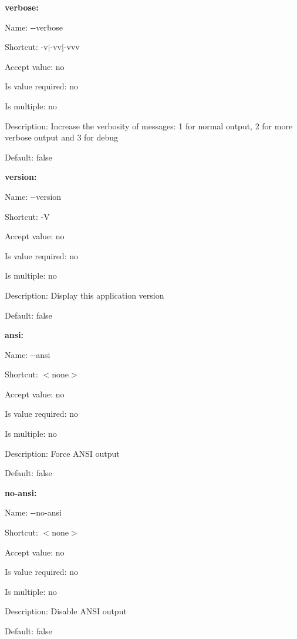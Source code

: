 {\bfseries verbose\+:}


\begin{DoxyItemize}
\item Name\+: {\ttfamily -\/-\/verbose}
\item Shortcut\+: {\ttfamily -\/v$\vert$-\/vv$\vert$-\/vvv}
\item Accept value\+: no
\item Is value required\+: no
\item Is multiple\+: no
\item Description\+: Increase the verbosity of messages\+: 1 for normal output, 2 for more verbose output and 3 for debug
\item Default\+: {\ttfamily false}
\end{DoxyItemize}

{\bfseries version\+:}


\begin{DoxyItemize}
\item Name\+: {\ttfamily -\/-\/version}
\item Shortcut\+: {\ttfamily -\/\+V}
\item Accept value\+: no
\item Is value required\+: no
\item Is multiple\+: no
\item Description\+: Display this application version
\item Default\+: {\ttfamily false}
\end{DoxyItemize}

{\bfseries ansi\+:}


\begin{DoxyItemize}
\item Name\+: {\ttfamily -\/-\/ansi}
\item Shortcut\+: $<$none$>$
\item Accept value\+: no
\item Is value required\+: no
\item Is multiple\+: no
\item Description\+: Force A\+N\+S\+I output
\item Default\+: {\ttfamily false}
\end{DoxyItemize}

{\bfseries no-\/ansi\+:}


\begin{DoxyItemize}
\item Name\+: {\ttfamily -\/-\/no-\/ansi}
\item Shortcut\+: $<$none$>$
\item Accept value\+: no
\item Is value required\+: no
\item Is multiple\+: no
\item Description\+: Disable A\+N\+S\+I output
\item Default\+: {\ttfamily false}
\end{DoxyItemize}

